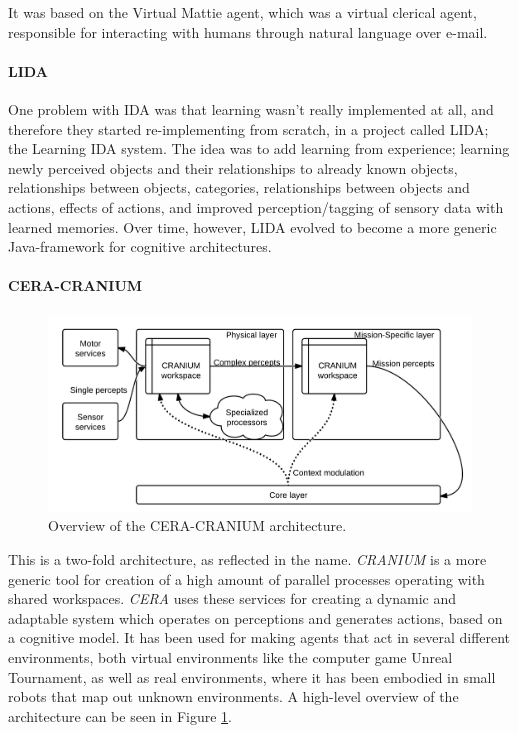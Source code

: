 It was based on the Virtual Mattie agent, which was a virtual clerical agent, responsible for interacting with humans through natural language over e-mail.\cite{franklin1996virtual}

\paragraph{LIDA}
One problem with IDA was that learning wasn't really implemented at all, and therefore they started re-implementing from scratch, in a project called LIDA; the Learning IDA system. The idea was to add learning from experience; learning newly perceived objects and their relationships to already known objects, relationships between objects, categories, relationships between objects and actions, effects of actions, and improved perception/tagging of sensory data with learned memories.\cite{franklin2006lida} Over time, however, LIDA evolved to become a more generic Java-framework for cognitive architectures.\cite{snaider2011lida}

\paragraph{CERA-CRANIUM}
\begin{figure}[h!tb]
\centering
\includegraphics[width=\textwidth]{graphics/ceracranium.png}
\caption{Overview of the CERA-CRANIUM architecture.}
\label{fig:cera-cranium}
\end{figure}
This is a two-fold architecture, as reflected in the name. {\em CRANIUM} is a more generic tool for creation of a high amount of parallel processes operating with shared workspaces. {\em CERA} uses these services for creating a dynamic and adaptable system which operates on perceptions and generates actions, based on a cognitive model.\cite{arrabales2009gamechars} It has been used for making agents that act in several different environments, both virtual environments like the computer game Unreal Tournament, as well as real environments, where it has been embodied in small robots that map out unknown environments. \cite{arrabales2009ceracranium} A high-level overview of the architecture can be seen in Figure \ref{fig:cera-cranium}.


